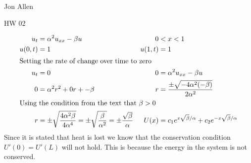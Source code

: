 \documentclass{article}
\begin{document}
Jon Allen

HW 02

\begin{align*}
  u_t&=\alpha^2u_{xx}-\beta u & 0&<x<1\\
  u(0,t)&=1 & u(1,t)&=1\\
  \intertext{Setting the rate of change over time to zero}
  u_t&=0 & 0&=\alpha^2 u_{xx}-\beta u\\
  0&=\alpha^2r^2+0r+-\beta & r&=\frac{\pm\sqrt{-4\alpha^2(-\beta)}}{2\alpha^2}\\
  \intertext{Using the condition from the text that $\beta>0$}
  r&=\pm\sqrt{\frac{4\alpha^2\beta}{4\alpha^4}}=\pm\sqrt{\frac{\beta}{\alpha^2}}=\pm\frac{\sqrt{\beta}}{\alpha} &
  U(x)&=c_1e^{x\sqrt{\beta}/\alpha}+c_2e^{-x\sqrt{\beta}/\alpha}
\end{align*}
Since it is stated that heat is lost we know that the conservation condition $U'(0)=U'(L)$ will not hold. This is because the energy in the system is not conserved.
\end{document}
